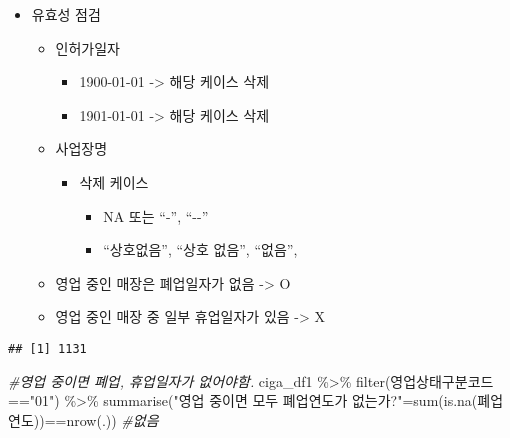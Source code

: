 \documentclass[
]{book}
\newenvironment{Shaded}{\begin{snugshade}}{\end{snugshade}}
\newcommand{\CommentTok}[1]{\textcolor[rgb]{0.56,0.35,0.01}{\textit{#1}}}
\newcommand{\FunctionTok}[1]{\textcolor[rgb]{0.00,0.00,0.00}{#1}}
\newcommand{\NormalTok}[1]{#1}
\newcommand{\OtherTok}[1]{\textcolor[rgb]{0.56,0.35,0.01}{#1}}
\newcommand{\SpecialCharTok}[1]{\textcolor[rgb]{0.00,0.00,0.00}{#1}}
\newcommand{\StringTok}[1]{\textcolor[rgb]{0.31,0.60,0.02}{#1}}
\begin{document}
\begin{itemize}
\item
  유효성 점검

  \begin{itemize}
  \item
    인허가일자

    \begin{itemize}
    \item
      1900-01-01 -\textgreater{} 해당 케이스 삭제
    \item
      1901-01-01 -\textgreater{} 해당 케이스 삭제
    \end{itemize}
  \item
    사업장명

    \begin{itemize}
    \item
      삭제 케이스

      \begin{itemize}
      \item
        NA 또는 ``-'', ``-\/-''
      \item
        ``상호없음'', ``상호 없음'', ``없음'',
      \end{itemize}
    \end{itemize}
  \item
    영업 중인 매장은 폐업일자가 없음 -\textgreater{} O
  \item
    영업 중인 매장 중 일부 휴업일자가 있음 -\textgreater{} X
  \end{itemize}
\end{itemize}

\begin{Shaded}
\end{Shaded}

\begin{verbatim}
## [1] 1131
\end{verbatim}

\begin{Shaded}
\begin{Highlighting}[]
\CommentTok{\#영업 중이면 폐업, 휴업일자가 없어야함.}
\NormalTok{ciga\_df1 }\SpecialCharTok{\%\textgreater{}\%} 
  \FunctionTok{filter}\NormalTok{(영업상태구분코드}\SpecialCharTok{==}\StringTok{"01"}\NormalTok{) }\SpecialCharTok{\%\textgreater{}\%}
  \FunctionTok{summarise}\NormalTok{(}\StringTok{"영업 중이면 모두 폐업연도가 없는가?"}\OtherTok{=}\FunctionTok{sum}\NormalTok{(}\FunctionTok{is.na}\NormalTok{(폐업연도))}\SpecialCharTok{==}\FunctionTok{nrow}\NormalTok{(.)) }\CommentTok{\#없음}
\end{Highlighting}
\end{Shaded}
\end{document}

